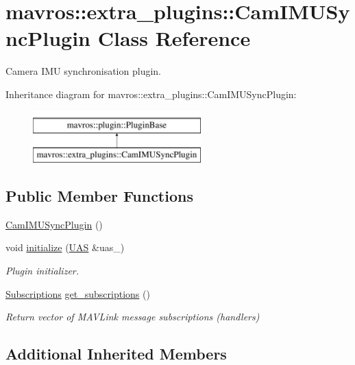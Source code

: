 \hypertarget{classmavros_1_1extra__plugins_1_1CamIMUSyncPlugin}{}\section{mavros\+::extra\+\_\+plugins\+::Cam\+I\+M\+U\+Sync\+Plugin Class Reference}
\label{classmavros_1_1extra__plugins_1_1CamIMUSyncPlugin}


Camera I\+MU synchronisation plugin.  


Inheritance diagram for mavros\+::extra\+\_\+plugins\+::Cam\+I\+M\+U\+Sync\+Plugin\+:\begin{figure}[H]
\begin{center}
\leavevmode
\includegraphics[height=2.000000cm]{classmavros_1_1extra__plugins_1_1CamIMUSyncPlugin}
\end{center}
\end{figure}
\subsection*{Public Member Functions}
\begin{DoxyCompactItemize}
\item 
\mbox{\hyperlink{group__plugin_gad8c0b7cdde6942c12add29c49e0c3067}{Cam\+I\+M\+U\+Sync\+Plugin}} ()
\item 
void \mbox{\hyperlink{group__plugin_ga6f1ea337208a0cc239f23025209b8be8}{initialize}} (\mbox{\hyperlink{classmavros_1_1UAS}{U\+AS}} \&uas\+\_\+)
\begin{DoxyCompactList}\small\item\em Plugin initializer. \end{DoxyCompactList}\item 
\mbox{\hyperlink{group__plugin_ga8967d61fc77040e0c3ea5a4585d62a09}{Subscriptions}} \mbox{\hyperlink{group__plugin_gad1579267289ff44ce0ddcb795e480663}{get\+\_\+subscriptions}} ()
\begin{DoxyCompactList}\small\item\em Return vector of M\+A\+V\+Link message subscriptions (handlers) \end{DoxyCompactList}\end{DoxyCompactItemize}
\subsection*{Additional Inherited Members}


